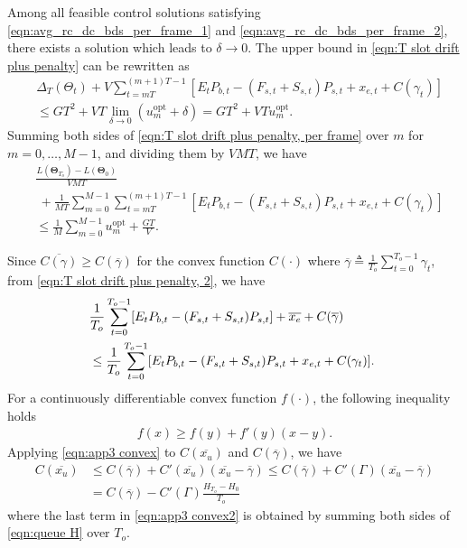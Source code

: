 \documentclass[journal]{IEEEtran}
\def\Thetabf{\boldsymbol \Theta}
\def\nn{\nonumber}
\begin{document}
Among all feasible control solutions satisfying \eqref{eqn:avg_rc_dc_bds_per_frame_1} and \eqref{eqn:avg_rc_dc_bds_per_frame_2}, there exists a solution which leads to $\delta\rightarrow0$. The upper bound in \eqref{eqn:T slot drift plus penalty} can be rewritten as
\begin{align}\label{eqn:T slot drift plus penalty, per frame}
&\Delta_T(\Theta_t) +V\!\!\!\!\!\sum_{t=mT}^{(m+1)T-1}\!\!\!\!\![E_tP_{b,t}-(F_{s,t}+S_{s,t})P_{s,t}+x_{e,t}+C(\gamma_t)]\nn\\
&\leq G T^2+VT\lim_{\delta\rightarrow0}\left(u_m^\textrm{opt}+\delta\right)= G T^2+VTu_m^\textrm{opt}.
\end{align}
Summing both sides of \eqref{eqn:T slot drift plus penalty, per frame} over $m$ for $m=0,\ldots, M-1$, and dividing them by $VMT$, we have
{\small
\begin{align}\label{eqn:T slot drift plus penalty, 2}
&\frac{L(\Thetabf_{T_o})-L(\Thetabf_0)}{VMT}\nn\\
&\ +\frac{1}{MT}\sum_{m=0}^{M-1}\sum_{t=mT}^{(m+1)T-1}\!\!\!\!\![E_tP_{b,t}-(F_{s,t}+S_{s,t})P_{s,t}+x_{e,t}+C(\gamma_t)]\nn\\
&\leq
\frac{1}{M}\sum_{m=0}^{M-1}u_m^\textrm{opt}+\frac{G T}{V}.
\end{align}}

Since $\overline{C(\gamma)}\geq C(\overline{\gamma})$ for the convex function $C(\cdot)$ where $\overline{\gamma}\triangleq \frac{1}{T_o}\sum_{t=0}^{T_o-1}\gamma_t$, from \eqref{eqn:T slot drift plus penalty, 2}, we have
\begin{align}\label{eqn:T slot drift plus penalty, 3}
&\hspace*{-0.5em}\frac{1}{T_o}\sum_{t=0}^{T_o-1}[E_tP_{b,t}-(F_{s,t}+S_{s,t})P_{s,t}]+\overline{x_e}+C(\overline{\gamma})\nn\\
&\hspace*{-0.5em}\leq
\frac{1}{T_o}\sum_{t=0}^{T_o-1}[E_tP_{b,t}-(F_{s,t}+S_{s,t})P_{s,t}+x_{e,t}+C(\gamma_t)].
\end{align}
For a continuously differentiable convex function $f(\cdot)$, the following inequality holds \cite{book:Boyd&Vandenberghe}
\begin{align}\label{eqn:app3 convex}
f(x)\geq f(y)+f'(y)(x-y).
\end{align}
Applying \eqref{eqn:app3 convex} to $C(\overline{x_u})$ and $C(\overline{\gamma})$, we have
\begin{align}\label{eqn:app3 convex2}
C(\overline{x_u})
&\leq C(\overline{\gamma})+C'(\overline{x_u})(\overline{x_u}-\overline{\gamma})
\leq C(\overline{\gamma})+C'(\Gamma)(\overline{x_u}-\overline{\gamma})\nn\\
&=C(\overline{\gamma})-C'(\Gamma)\frac{H_{T_o}-H_0}{T_o}
\end{align}
where the last term in \eqref{eqn:app3 convex2} is obtained by summing both sides of \eqref{eqn:queue H} over $T_o$.
\end{document}
